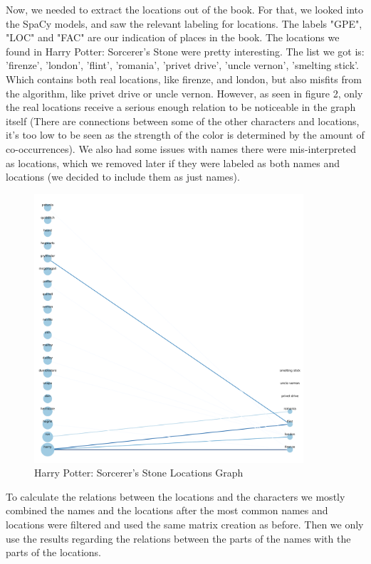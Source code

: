 \documentclass{article}
\begin{document}
Now, we needed to extract the locations out of the book. For that, we looked into the SpaCy models, and saw the relevant labeling for locations. The labels "GPE", "LOC" and "FAC" are our indication of places in the book. The locations we found in Harry Potter: Sorcerer's Stone were pretty interesting. The list we got is: 'firenze', 'london', 'flint', 'romania', 'privet drive', 'uncle vernon', 'smelting stick'. Which contains both real locations, like firenze, and london, but also misfits from the algorithm, like privet drive or uncle vernon. However, as seen in figure 2, only the real locations receive a serious enough relation to be noticeable in the graph itself (There are connections between some of the other characters and locations, it's too low to be seen as the strength of the color is determined by the amount of co-occurrences). We also had some issues with names there were mis-interpreted as locations, which we removed later if they were labeled as both names and locations (we decided to include them as just names).
\begin{figure}[h]
  \centering
  \includegraphics[width=10cm]{Harry Potter 1 - Sorcerer's Stone locations graph.png}
  \caption{Harry Potter: Sorcerer's Stone Locations Graph}
  \label{fig2}
\end{figure}

To calculate the relations between the locations and the characters we mostly combined the names and the locations after the most common names and locations were filtered and used the same matrix creation as before. Then we only use the results regarding the relations between the parts of the names with the parts of the locations.
\end{document}
